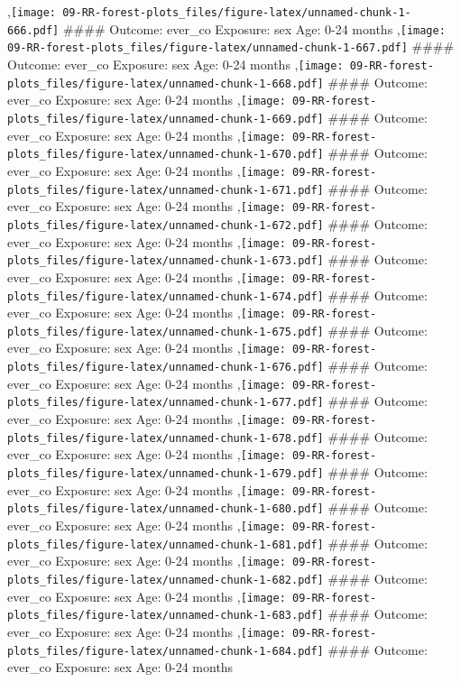 \documentclass[
  9pt,
]{book}
\begin{document}
,\texttt{[image: 09-RR-forest-plots\_files/figure-latex/unnamed-chunk-1-666.pdf]}
\#\#\#\# Outcome: ever\_co Exposure: sex Age: 0-24 months
,\texttt{[image: 09-RR-forest-plots\_files/figure-latex/unnamed-chunk-1-667.pdf]}
\#\#\#\# Outcome: ever\_co Exposure: sex Age: 0-24 months
,\texttt{[image: 09-RR-forest-plots\_files/figure-latex/unnamed-chunk-1-668.pdf]}
\#\#\#\# Outcome: ever\_co Exposure: sex Age: 0-24 months
,\texttt{[image: 09-RR-forest-plots\_files/figure-latex/unnamed-chunk-1-669.pdf]}
\#\#\#\# Outcome: ever\_co Exposure: sex Age: 0-24 months
,\texttt{[image: 09-RR-forest-plots\_files/figure-latex/unnamed-chunk-1-670.pdf]}
\#\#\#\# Outcome: ever\_co Exposure: sex Age: 0-24 months
,\texttt{[image: 09-RR-forest-plots\_files/figure-latex/unnamed-chunk-1-671.pdf]}
\#\#\#\# Outcome: ever\_co Exposure: sex Age: 0-24 months
,\texttt{[image: 09-RR-forest-plots\_files/figure-latex/unnamed-chunk-1-672.pdf]}
\#\#\#\# Outcome: ever\_co Exposure: sex Age: 0-24 months
,\texttt{[image: 09-RR-forest-plots\_files/figure-latex/unnamed-chunk-1-673.pdf]}
\#\#\#\# Outcome: ever\_co Exposure: sex Age: 0-24 months
,\texttt{[image: 09-RR-forest-plots\_files/figure-latex/unnamed-chunk-1-674.pdf]}
\#\#\#\# Outcome: ever\_co Exposure: sex Age: 0-24 months
,\texttt{[image: 09-RR-forest-plots\_files/figure-latex/unnamed-chunk-1-675.pdf]}
\#\#\#\# Outcome: ever\_co Exposure: sex Age: 0-24 months
,\texttt{[image: 09-RR-forest-plots\_files/figure-latex/unnamed-chunk-1-676.pdf]}
\#\#\#\# Outcome: ever\_co Exposure: sex Age: 0-24 months
,\texttt{[image: 09-RR-forest-plots\_files/figure-latex/unnamed-chunk-1-677.pdf]}
\#\#\#\# Outcome: ever\_co Exposure: sex Age: 0-24 months
,\texttt{[image: 09-RR-forest-plots\_files/figure-latex/unnamed-chunk-1-678.pdf]}
\#\#\#\# Outcome: ever\_co Exposure: sex Age: 0-24 months
,\texttt{[image: 09-RR-forest-plots\_files/figure-latex/unnamed-chunk-1-679.pdf]}
\#\#\#\# Outcome: ever\_co Exposure: sex Age: 0-24 months
,\texttt{[image: 09-RR-forest-plots\_files/figure-latex/unnamed-chunk-1-680.pdf]}
\#\#\#\# Outcome: ever\_co Exposure: sex Age: 0-24 months
,\texttt{[image: 09-RR-forest-plots\_files/figure-latex/unnamed-chunk-1-681.pdf]}
\#\#\#\# Outcome: ever\_co Exposure: sex Age: 0-24 months
,\texttt{[image: 09-RR-forest-plots\_files/figure-latex/unnamed-chunk-1-682.pdf]}
\#\#\#\# Outcome: ever\_co Exposure: sex Age: 0-24 months
,\texttt{[image: 09-RR-forest-plots\_files/figure-latex/unnamed-chunk-1-683.pdf]}
\#\#\#\# Outcome: ever\_co Exposure: sex Age: 0-24 months
,\texttt{[image: 09-RR-forest-plots\_files/figure-latex/unnamed-chunk-1-684.pdf]}
\#\#\#\# Outcome: ever\_co Exposure: sex Age: 0-24 months
\end{document}
